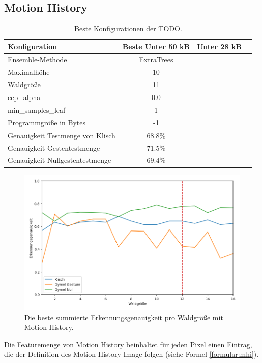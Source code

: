 \subsection{Motion History}
\begin{table}[h!]
    \centering
    \begin{tabular}{ | l | c | c | c |}
        \hline
        Konfiguration & Beste Unter 50 kB & Unter 28 kB \\\hline
        Ensemble-Methode & ExtraTrees & & \\\hline
        Maximalhöhe & 10 & & \\\hline
        Waldgröße & 11 & & \\\hline
        ccp\_alpha & 0.0 & & \\\hline
        min\_samples\_leaf & 1 & & \\\hline
        Programmgröße in Bytes & -1 & & \\\hline
        Genauigkeit Testmenge von Klisch & 68.8\% & & \\\hline
        Genauigkeit Gestentestmenge & 71.5\% & & \\\hline
        Genauigkeit Nullgestentestmenge & 69.4\% & & \\\hline
    \end{tabular}
    \caption{Beste Konfigurationen der TODO.}
    \label{tab:TODO}
\end{table}
\begin{figure}[h!]
    \centering
    \includegraphics[width=\linewidth]{images/motion_history_acc_per_size.png}
    \caption{Die beste summierte Erkennungsgenauigkeit pro Waldgröße mit Motion History.}
    \label{fig:motion_history_per_forest_size}
\end{figure}
Die Featuremenge von Motion History beinhaltet für jeden Pixel einen Eintrag, die der Definition des Motion History Image folgen (siehe Formel \ref{formular:mhi}).
